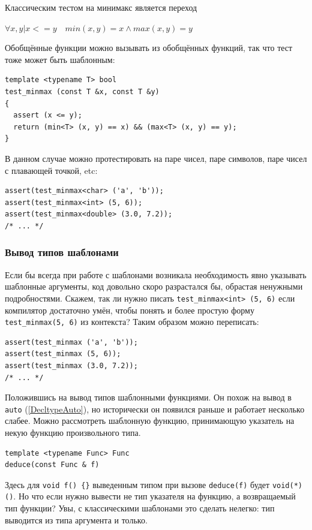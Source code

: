 \documentclass[a4paper,12pt,oneside]{article}
\begin{document}
Классическим тестом на минимакс является переход 

$\forall x, y | x <= y \quad min(x,y) = x \wedge max(x, y) = y$

Обобщённые функции можно вызывать из обобщённых функций, так что тест тоже может быть шаблонным:

\begin{lstlisting}
template <typename T> bool
test_minmax (const T &x, const T &y)
{
  assert (x <= y);
  return (min<T> (x, y) == x) && (max<T> (x, y) == y);
}

\end{lstlisting}

В данном случае можно протестировать на паре чисел, паре символов, паре чисел с плавающей точкой, etc:

\begin{lstlisting}
assert(test_minmax<char> ('a', 'b'));
assert(test_minmax<int> (5, 6));
assert(test_minmax<double> (3.0, 7.2));
/* ... */
\end{lstlisting}

\subsubsection{Вывод типов шаблонами}\label{TemplateInference}

Если бы всегда при работе с шаблонами возникала необходимость явно указывать шаблонные аргументы, код довольно скоро разрастался бы, обрастая ненужными подробностями. Скажем, так ли нужно писать \lstinline!test_minmax<int> (5, 6)! если компилятор достаточно умён, чтобы понять и более простую форму \lstinline!test_minmax(5, 6)! из контекста? Таким образом можно переписать:

\begin{lstlisting}
assert(test_minmax ('a', 'b'));
assert(test_minmax (5, 6));
assert(test_minmax (3.0, 7.2));
/* ... */
\end{lstlisting}

Положившись на вывод типов шаблонными функциями. Он похож на вывод в \lstinline!auto! (\ref{DecltypeAuto}), но исторически он появился раньше и работает несколько слабее. Можно рассмотреть шаблонную функцию, принимающую указатель на некую функцию произвольного типа.

\begin{lstlisting}
template <typename Func> Func 
deduce(const Func & f)
\end{lstlisting}

Здесь для \lstinline!void f() {}! выведенным типом при вызове \lstinline!deduce(f)! будет \lstinline!void(*)()!. Но что если нужно вывести не тип указателя на функцию, а возвращаемый тип функции? Увы, с классическими шаблонами это сделать нелегко: тип выводится из типа аргумента и только. 
\end{document}
